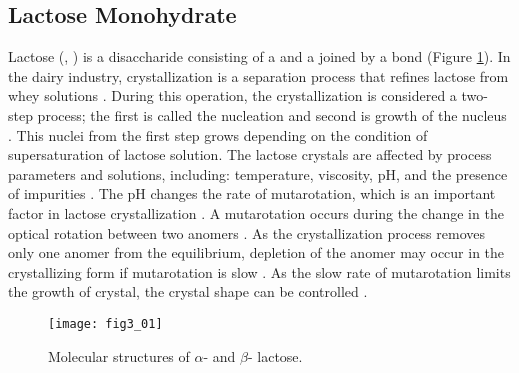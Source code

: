 \begin{refsection}
\begin{table}[htbp]
\begin{tabular}{lllll}
    \hline  
    \end{tabular} 
    \label{tab:micelle}
\end{table}

\subsection{Lactose Monohydrate}

Lactose (,
) is a disaccharide consisting of a  and a
 joined by a  bond (Figure
\ref{fig:lactose-structure}). In the dairy industry, crystallization is a
separation process that refines lactose from whey solutions
\cite{Hourigan2013}. During this operation, the crystallization is considered a
two-step process; the first is called the nucleation
\cite{Schmitt1999,Wong2014} and second is growth of the nucleus
\cite{Hourigan2013}.  This nuclei from the first step grows depending on the
condition of supersaturation of lactose solution.  The lactose crystals are
affected by process parameters and solutions, including: temperature,
viscosity, pH, and the presence of impurities \cite{Bhargava1996}. The pH
changes the rate of mutarotation, which is an important factor in lactose
crystallization \cite{Ganzle2008,Hourigan2013}. A mutarotation occurs during
the change in the optical rotation between two anomers \cite{Jelen1973a}. As
the crystallization process removes only one anomer from the equilibrium,
depletion of the anomer may occur in the crystallizing form if mutarotation is
slow \cite{Ganzle2008}. As the slow rate of mutarotation limits the growth of
crystal, the crystal shape can be controlled \cite{Ganzle2008}. 
\begin{figure}[htbp] \centering \texttt{[image: fig3\_01]}
    \caption[Molecular structures of $\alpha$- and $\beta$- lactose.]{Molecular
    structures of $\alpha$- and $\beta$- lactose.}
    \label{fig:lactose-structure}
\end{figure}


\end{refsection}
